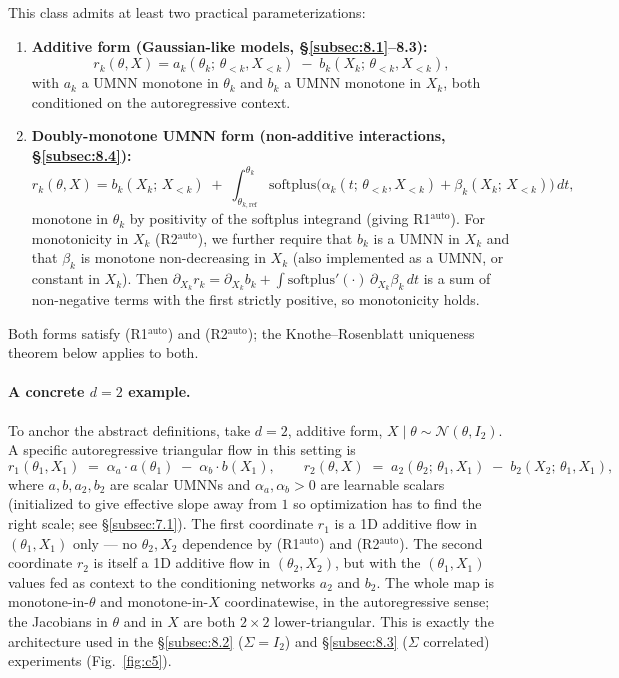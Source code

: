\documentclass[11pt]{article}
\providecommand{\tightlist}{\setlength{\itemsep}{0pt}\setlength{\parskip}{0pt}}
\begin{document}
This class admits at least two practical parameterizations:

\begin{enumerate}
\def\labelenumi{\arabic{enumi}.}
\tightlist
\item
  \textbf{Additive form (Gaussian-like models, \S\ref{subsec:8.1}--8.3):}
  \[r_k(\theta, X) = a_k(\theta_k;\, \theta_{<k}, X_{<k}) \;-\; b_k(X_k;\, \theta_{<k}, X_{<k}),\]
  with \(a_k\) a UMNN monotone in \(\theta_k\) and \(b_k\) a UMNN
  monotone in \(X_k\), both conditioned on the autoregressive context.
\item
  \textbf{Doubly-monotone UMNN form (non-additive interactions, \S\ref{subsec:8.4}):}
  \[r_k(\theta, X) = b_k(X_k;\, X_{<k}) \;+\; \int_{\theta_{k,\mathrm{ref}}}^{\theta_k} \mathrm{softplus}\bigl(\alpha_k(t;\, \theta_{<k}, X_{<k}) + \beta_k(X_k;\, X_{<k})\bigr)\, dt,\]
  monotone in \(\theta_k\) by positivity of the softplus integrand
  (giving R1\(^\mathrm{auto}\)). For monotonicity in \(X_k\) (R2\(^\mathrm{auto}\)),
  we further require that \(b_k\) is a UMNN in \(X_k\) and that
  \(\beta_k\) is monotone non-decreasing in \(X_k\) (also implemented as
  a UMNN, or constant in \(X_k\)). Then
  \(\partial_{X_k} r_k = \partial_{X_k} b_k + \int \mathrm{softplus}'(\cdot)\,\partial_{X_k}\beta_k\, dt\)
  is a sum of non-negative terms with the first strictly positive, so
  monotonicity holds.
\end{enumerate}

Both forms satisfy (R1\(^\mathrm{auto}\)) and (R2\(^\mathrm{auto}\));
the Knothe--Rosenblatt uniqueness theorem below applies to both.

\paragraph{A concrete \(d = 2\) example.}
To anchor the abstract definitions, take \(d = 2\), additive form,
\(X \mid \theta \sim \mathcal{N}(\theta, I_2)\). A specific
autoregressive triangular flow in this setting is
\[
r_1(\theta_1, X_1) \;=\; \alpha_a \cdot a(\theta_1) \;-\; \alpha_b \cdot b(X_1),
\qquad
r_2(\theta, X) \;=\; a_2(\theta_2;\, \theta_1, X_1) \;-\; b_2(X_2;\, \theta_1, X_1),
\]
where \(a, b, a_2, b_2\) are scalar UMNNs and \(\alpha_a, \alpha_b > 0\)
are learnable scalars (initialized to give effective slope away from
\(1\) so optimization has to find the right scale; see \S\ref{subsec:7.1}).
The first coordinate \(r_1\) is a 1D additive flow in
\((\theta_1, X_1)\) only --- no \(\theta_2, X_2\) dependence by
(R1\(^\mathrm{auto}\)) and (R2\(^\mathrm{auto}\)). The second
coordinate \(r_2\) is itself a 1D additive flow in
\((\theta_2, X_2)\), but with the \((\theta_1, X_1)\) values fed as
context to the conditioning networks \(a_2\) and \(b_2\). The whole map
is monotone-in-\(\theta\) and monotone-in-\(X\) coordinatewise, in the
autoregressive sense; the Jacobians in \(\theta\) and in \(X\) are
both \(2 \times 2\) lower-triangular. This is exactly the architecture
used in the \S\ref{subsec:8.2} (\(\Sigma = I_2\)) and \S\ref{subsec:8.3}
(\(\Sigma\) correlated) experiments (Fig.~\ref{fig:c5}).
\end{document}
